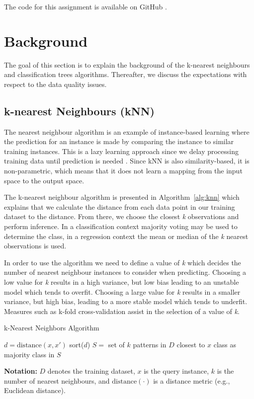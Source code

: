 \documentclass[10pt, conference]{IEEEtran}
\begin{document}
The code for this assignment is available on GitHub \cite{Voltzz9_ml441_assign2_2025}.


\section{Background}
The goal of this section is to explain the background of the k-nearest neighbours and classification trees algorithms. Thereafter, we discuss the expectations with respect to the data quality issues.
\subsection{k-nearest Neighbours (kNN)}
The nearest neighbour algorithm is an example of instance-based learning where the prediction for an instance is made by comparing the instance to similar training instances. This is a lazy learning approach since we delay processing training data until prediction is needed \cite{kelleher2020fundamentals}. Since kNN is also similarity-based, it is non-parametric, which means that it does not learn a mapping from the input space to the output space.

The k-nearest neighbour algorithm is presented in Algorithm~\ref{alg:knn} which explains that we calculate the distance from each data point in our training dataset to the distance. From there, we choose the closest \textit{k} observations and perform inference. In a classification context majority voting may be used to determine the class, in a regression context the mean or median of the \textit{k} nearest observations is used.

In order to use the algorithm we need to define a value of \textit{k} which decides the number of nearest neighbour instances to consider when predicting. Choosing a low value for \textit{k} results in a high variance, but low bias leading to an unstable model which tends to overfit. Choosing a large value for \textit{k} results in a smaller variance, but high bias, leading to a more stable model which tends to underfit. Measures such as k-fold cross-validation assist in the selection of a value of \textit{k}.

\begin{algorithm}[htbp]
\caption{k-Nearest Neighbors Algorithm}
\label{alg:knn}
\begin{algorithmic}
\State $d = \text{distance}(x, x')$
\EndFor
\State sort($d$)
\State $S = $ set of $k$ patterns in $D$ closest to $x$
\State \Return class as majority class in $S$
\EndFunction
\end{algorithmic}
\end{algorithm}
\noindent
\textbf{Notation:} $D$ denotes the training dataset, $x$ is the query instance, $k$ is the number of nearest neighbours, and $\text{distance}(\cdot)$ is a distance metric (e.g., Euclidean distance).
\end{document}
